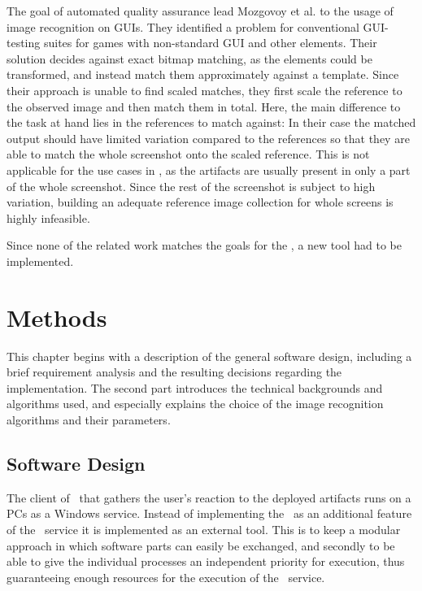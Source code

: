 The goal of automated quality assurance lead Mozgovoy et al. \cite{qa_image-rec} to the usage of image recognition on GUIs. They identified a problem for conventional GUI-testing suites for games with non-standard GUI and other elements. Their solution decides against exact bitmap matching, as the elements could be transformed, and instead match them approximately against a template. Since their approach is unable to find scaled matches, they first scale the reference to the observed image and then match them in total. Here, the main difference to the task at hand lies in the references to match against: In their case the matched output should have limited variation compared to the references so that they are able to match the whole screenshot onto the scaled reference. This is not applicable for the use cases in \ape, as the artifacts are usually present in only a part of the whole screenshot. Since the rest of the screenshot is subject to high variation, building an adequate reference image collection for whole screens is highly infeasible.

Since none of the related work matches the goals for the \vad, a new tool had to be implemented.

\chapter{Methods}\label{ch:methods}

This chapter begins with a description of the general software design, including a brief requirement analysis and the resulting decisions regarding the implementation. The second part introduces the technical backgrounds and algorithms used, and especially explains the choice of the image recognition algorithms and their parameters.

\section{Software Design}\label{sec:software-design}

The client of \ape~that gathers the user's reaction to the deployed artifacts runs on a PCs as a Windows service. Instead of implementing the \vad~as an additional feature of the \ape~service it is implemented as an external tool. This is to keep a modular approach in which software parts can easily be exchanged, and secondly to be able to give the individual processes an independent priority for execution, thus guaranteeing enough resources for the execution of the \ape~service.

